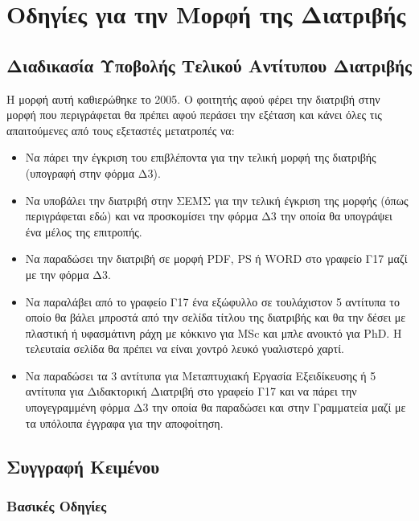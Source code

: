 \chapter{Οδηγίες για την Μορφή της Διατριβής}
\label{ch:Instructions}


\section{Διαδικασία Υποβολής Τελικού Αντίτυπου Διατριβής}
\label{sec:Submission}

{\color{red}
Η μορφή αυτή καθιερώθηκε το 2005. Ο φοιτητής αφού φέρει την
διατριβή στην μορφή που περιγράφεται θα πρέπει αφού περάσει την
εξέταση και κάνει όλες τις απαιτούμενες από τους εξεταστές
μετατροπές να:

\begin{itemize}
\item Να πάρει την έγκριση του επιβλέποντα για την τελική μορφή της διατριβής (υπογραφή στην φόρμα Δ3).
\item Να υποβάλει την διατριβή στην ΣΕΜΣ για την τελική έγκριση της μορφής (όπως περιγράφεται εδώ) και να προσκομίσει την φόρμα Δ3 την οποία θα υπογράψει ένα μέλος της επιτροπής.
\item Να παραδώσει την διατριβή σε μορφή PDF, PS ή WORD στο γραφείο Γ17 μαζί με την φόρμα Δ3.
\item Να παραλάβει από το γραφείο Γ17 ένα εξώφυλλο σε τουλάχιστον 5 αντίτυπα το οποίο θα βάλει μπροστά από την σελίδα τίτλου της διατριβής και θα την δέσει με πλαστική ή υφασμάτινη ράχη με κόκκινο για MSc και μπλε ανοικτό για PhD. H τελευταία σελίδα θα πρέπει να είναι χοντρό λευκό γυαλιστερό χαρτί.
\item Να παραδώσει τα 3 αντίτυπα για Μεταπτυχιακή Εργασία Εξειδίκευσης ή 5 αντίτυπα για Διδακτορική Διατριβή στο γραφείο Γ17 και να πάρει την υπογεγραμμένη φόρμα Δ3 την οποία θα παραδώσει και στην Γραμματεία μαζί με τα υπόλοιπα έγγραφα για την αποφοίτηση.
\end{itemize}}


\section{Συγγραφή Κειμένου}
\label{sec:Text}

\subsection{Βασικές Οδηγίες}
\label{subsec:Basic}

